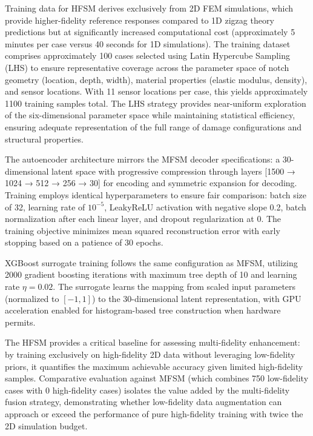 \documentclass[12pt,a4paper]{report}
\begin{document}
Training data for HFSM derives exclusively from 2D FEM simulations, which provide higher-fidelity reference responses compared to 1D zigzag theory predictions but at significantly increased computational cost (approximately 5 minutes per case versus 40 seconds for 1D simulations). The training dataset comprises approximately 100 cases selected using Latin Hypercube Sampling (LHS) to ensure representative coverage across the parameter space of notch geometry (location, depth, width), material properties (elastic modulus, density), and sensor locations. With 11 sensor locations per case, this yields approximately 1100 training samples total. The LHS strategy provides near-uniform exploration of the six-dimensional parameter space while maintaining statistical efficiency, ensuring adequate representation of the full range of damage configurations and structural properties.

The autoencoder architecture mirrors the MFSM decoder specifications: a 30-dimensional latent space with progressive compression through layers [1500 → 1024 → 512 → 256 → 30] for encoding and symmetric expansion for decoding. Training employs identical hyperparameters to ensure fair comparison: batch size of 32, learning rate of $10^{-5}$, LeakyReLU activation with negative slope 0.2, batch normalization after each linear layer, and dropout regularization at 0. The training objective minimizes mean squared reconstruction error with early stopping based on a patience of 30 epochs.

XGBoost surrogate training follows the same configuration as MFSM, utilizing 2000 gradient boosting iterations with maximum tree depth of 10 and learning rate $\eta = 0.02$. The surrogate learns the mapping from scaled input parameters (normalized to $[-1, 1]$) to the 30-dimensional latent representation, with GPU acceleration enabled for histogram-based tree construction when hardware permits.

The HFSM provides a critical baseline for assessing multi-fidelity enhancement: by training exclusively on high-fidelity 2D data without leveraging low-fidelity priors, it quantifies the maximum achievable accuracy given limited high-fidelity samples. Comparative evaluation against MFSM (which combines 750 low-fidelity cases with 0 high-fidelity cases) isolates the value added by the multi-fidelity fusion strategy, demonstrating whether low-fidelity data augmentation can approach or exceed the performance of pure high-fidelity training with twice the 2D simulation budget.
\end{document}
